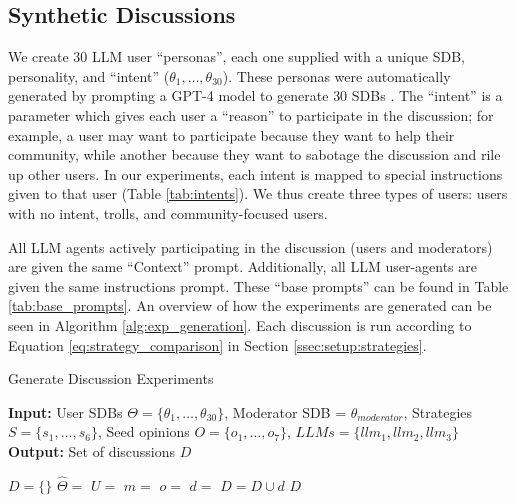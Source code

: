 \subsection{Synthetic Discussions}
\label{ssec:experimental:discussions}

We create 30 \ac{LLM} user “personas”,  each one supplied with a unique \ac{SDB}, personality, and “intent” ($\theta_1, \ldots, \theta_{30}$). These personas were automatically generated by prompting a GPT-4 model to generate $30$ \acp{SDB} \cite{openai2024gpt4technicalreport}. The “intent” is a parameter which gives each user a “reason” to participate in the discussion; for example, a user may want to participate because they want to help their community, while another because they want to sabotage the discussion and rile up other users. In our experiments, each intent is mapped to special instructions given to that user (Table \ref{tab:intents}). We thus create three types of users: users with no intent, trolls, and community-focused users.

All \ac{LLM} agents actively participating in the discussion (users and moderators) are given the same “Context” prompt. Additionally, all \ac{LLM} user-agents are given the same instructions prompt. These “base prompts” can be found in Table \ref{tab:base_prompts}. An overview of how the experiments are generated can be seen in Algorithm \ref{alg:exp_generation}. Each discussion is run according to Equation \ref{eq:strategy_comparison} in Section \ref{ssec:setup:strategies}. 

\begin{algorithm}
\caption{Generate Discussion Experiments}
\label{alg:exp_generation}
\hspace*{\algorithmicindent} \textbf{Input:} 
         User \acp{SDB} $\Theta = \{\theta_1, \dots, \theta_{30}\}$, Moderator SDB = $\theta_{moderator}$, Strategies $S = \{s_1, \ldots, s_6\}$, Seed opinions $O = \{o_1, \ldots, o_7\}$, $LLMs = \{llm_1, llm_2, llm_3\}$\\
\hspace*{\algorithmicindent} \textbf{Output:} Set of discussions $D$
\begin{algorithmic}[1]
    \State $D = \{\}$
                \State $\hat{\Theta} = $ 
                \State $U =$  
                \State $m = $ 
                \State $o = $ 
                \State $d =$ 
                \State $D = D \cup d$
            \EndFor
        \EndFor
    \EndFor
    \State \Return $D$
\end{algorithmic}
\end{algorithm}


